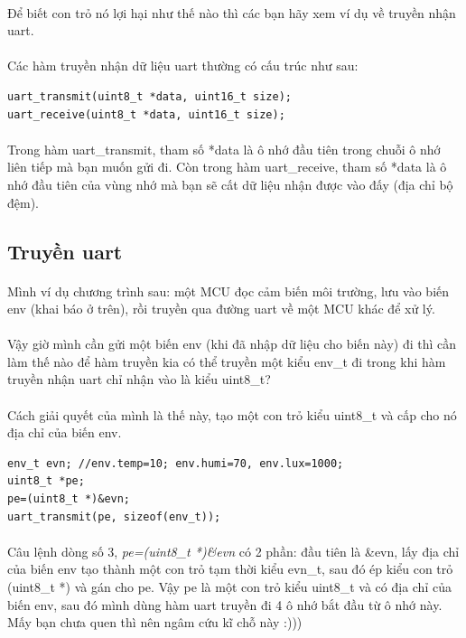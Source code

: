 \documentclass[12pt,a5paper]{book}
\begin{document}
\paragraph{}
Để biết con trỏ nó lợi hại như thế nào thì các bạn hãy xem ví dụ về truyền nhận uart.
\paragraph{}
Các hàm truyền nhận dữ liệu uart thường có cấu trúc như sau:
\begin{lstlisting}
uart_transmit(uint8_t *data, uint16_t size);
uart_receive(uint8_t *data, uint16_t size);
\end{lstlisting}
\paragraph{}
Trong hàm uart\_transmit, tham số *data là ô nhớ đầu tiên trong chuỗi ô nhớ liên tiếp mà bạn muốn gửi đi. Còn trong hàm uart\_receive, tham số *data là ô nhớ đầu tiên của vùng nhớ mà bạn sẽ cất dữ liệu nhận được vào đấy (địa chỉ bộ đệm).
\subsection{Truyền uart}
\paragraph{}
Mình ví dụ chương trình sau: một MCU đọc cảm biến môi trường, lưu vào biến env (khai báo ở trên), rồi truyền qua đường uart về một MCU khác để xử lý.

\paragraph{}
Vậy giờ mình cần gửi một biến env (khi đã nhập dữ liệu cho biến này) đi thì cần làm thế nào để hàm truyền kia có thể truyền một kiểu env\_t đi trong khi hàm truyền nhận uart chỉ nhận vào là kiểu uint8\_t?
\paragraph{}
Cách giải quyết của mình là thế này, tạo một con trỏ kiểu uint8\_t và cấp cho nó địa chỉ của biến env.
\begin{lstlisting}
env_t evn; //env.temp=10; env.humi=70, env.lux=1000;
uint8_t *pe;
pe=(uint8_t *)&evn;
uart_transmit(pe, sizeof(env_t));
\end{lstlisting}
\paragraph{}
Câu lệnh dòng số 3, \textit{pe=(uint8\_t *)\&evn} có 2 phần: đầu tiên là \&evn, lấy địa chỉ của biến env tạo thành một con trỏ tạm thời kiểu evn\_t, sau đó ép kiểu con trỏ (uint8\_t *) và gán cho pe. Vậy pe là một con trỏ kiểu uint8\_t và có địa chỉ của biến env, sau đó mình dùng hàm uart truyền đi 4 ô nhớ bắt đầu từ ô nhớ này. Mấy bạn chưa quen thì nên ngâm cứu kĩ chỗ này :)))
\end{document}
